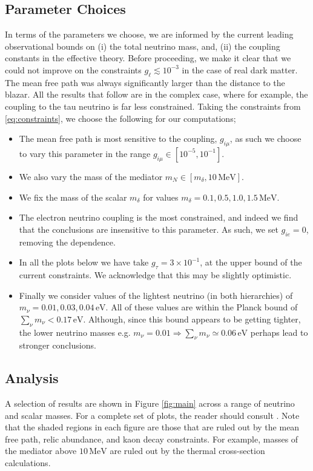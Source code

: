 \subsection{Parameter Choices}


In terms of the parameters we choose, we are informed by the current leading observational bounds on (i) the total neutrino mass, and, (ii) the coupling constants in the effective theory. Before proceeding, we make it clear that we could not improve on the constraints $g_{\ell} \lesssim 10^{-3}$ in the case of real dark matter. The mean free path was always significantly larger than the distance to the blazar. All the results that follow are in the complex case, where for example, the coupling to the tau neutrino is far less constrained. Taking the constraints from \eqref{eq:constraints}, we choose the following for our computations;
\begin{itemize}
  \item The mean free path is most sensitive to the coupling, $g_{i\mu}$, as such we choose to vary this parameter in the range $g_{i\mu} \in [10^{-5}, 10^{-1}]$.
  \item We also vary the mass of the mediator $m_N \in [m_\delta, 10\,\textrm{MeV}]$.
  \item We fix the mass of the scalar $m_\delta$ for values $m_\delta = 0.1, 0.5, 1.0, 1.5 \, \textrm{MeV}$.
  \item The electron neutrino coupling is the most constrained, and indeed we find that the conclusions are insensitive to this parameter. As such, we set $g_{ie} = 0$, removing the dependence.
  \item In all the plots below we have take $g_{\tau} = 3\times 10^{-1}$, at the upper bound of the current constraints. We acknowledge that this may be slightly optimistic.
  \item Finally we consider values of the lightest neutrino (in both hierarchies) of $m_\nu = 0.01, 0.03, 0.04\,\textrm{eV}$. All of these values are within the Planck bound of $\sum_{\nu}{m_\nu} < 0.17 \, \textrm{eV}$. Although, since this bound appears to be getting tighter, the lower neutrino masses e.g. $m_\nu = 0.01 \Rightarrow \sum_{\nu}{m_\nu} \simeq 0.06 \, \textrm{eV}$ perhaps lead to stronger conclusions.
\end{itemize}


\subsection{Analysis}
A selection of results are shown in Figure \ref{fig:main} across a range of neutrino and scalar masses. For a complete set of plots, the reader should consult \cite{Alvey:2019jzx}. Note that the shaded regions in each figure are those that are ruled out by the mean free path, relic abundance, and kaon decay constraints. For example, masses of the mediator above $10 \, \textrm{MeV}$ are ruled out by the thermal cross-section calculations.

